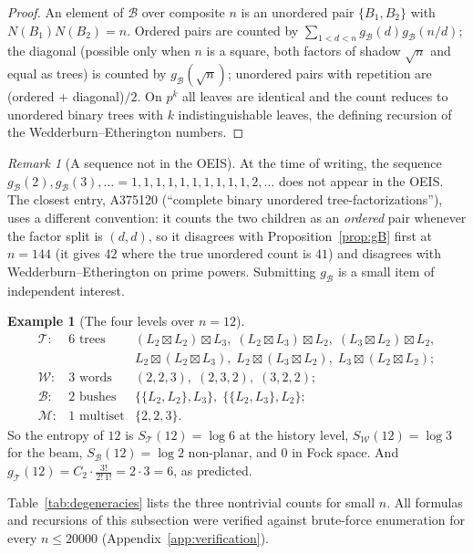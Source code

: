 \documentclass[11pt]{article}
\newcommand{\cT}{\mathcal{T}}   %
\newcommand{\cW}{\mathcal{W}}   %
\newcommand{\cB}{\mathcal{B}}   %
\newcommand{\cM}{\mathcal{M}}   %
\numberwithin{equation}{section}
\theoremstyle{plain}
\theoremstyle{definition}
\newtheorem{example}[theorem]{Example}
\theoremstyle{remark}
\newtheorem{remark}[theorem]{Remark}
\begin{document}
\begin{proof}
An element of $\cB$ over composite $n$ is an unordered pair $\{B_1,B_2\}$ with
$N(B_1)N(B_2) = n$. Ordered pairs are counted by $\sum_{1<d<n} g_\cB(d)g_\cB(n/d)$;
the diagonal (possible only when $n$ is a square, both factors of shadow $\sqrt n$ and
equal as trees) is counted by $g_\cB(\sqrt n)$; unordered pairs with repetition are
(ordered $+$ diagonal)$/2$. On $p^k$ all leaves are identical and the count reduces to
unordered binary trees with $k$ indistinguishable leaves, the defining recursion of
the Wedderburn--Etherington numbers.
\end{proof}

\begin{remark}[A sequence not in the OEIS]\label{rem:newseq}
At the time of writing, the sequence $g_\cB(2), g_\cB(3), \dots =
1,1,1,1,1,1,1,1,1,1,2,\dots$ does not appear in the OEIS. The closest entry, A375120
(``complete binary unordered tree-factorizations''), uses a different convention: it
counts the two children as an \emph{ordered} pair whenever the factor split is
$(d,d)$, so it disagrees with Proposition~\ref{prop:gB} first at $n=144$ (it gives
$42$ where the true unordered count is $41$) and disagrees with
Wedderburn--Etherington on prime powers. Submitting $g_\cB$ is a small item of
independent interest.
\end{remark}

\begin{example}[The four levels over $n = 12$]\label{ex:twelve}
\[
\begin{array}{lll}
\cT: & 6 \text{ trees} &
(L_2\boxtimes L_2)\boxtimes L_3,\;
(L_2\boxtimes L_3)\boxtimes L_2,\;
(L_3\boxtimes L_2)\boxtimes L_2, \\
& & L_2\boxtimes(L_2\boxtimes L_3),\;
L_2\boxtimes(L_3\boxtimes L_2),\;
L_3\boxtimes(L_2\boxtimes L_2); \\[1mm]
\cW: & 3 \text{ words} & (2,2,3),\; (2,3,2),\; (3,2,2); \\[1mm]
\cB: & 2 \text{ bushes} & \{\{L_2,L_2\},L_3\},\; \{\{L_2,L_3\},L_2\}; \\[1mm]
\cM: & 1 \text{ multiset} & \{2,2,3\}.
\end{array}
\]
So the entropy of $12$ is $S_\cT(12) = \log 6$ at the history level,
$S_\cW(12) = \log 3$ for the beam, $S_\cB(12) = \log 2$ non-planar, and $0$ in Fock
space. And $g_\cT(12) = C_2 \cdot \tfrac{3!}{2!\,1!} = 2\cdot 3 = 6$, as predicted.
\end{example}

Table~\ref{tab:degeneracies} lists the three nontrivial counts for small $n$. All
formulas and recursions of this subsection were verified against brute-force
enumeration for every $n \le 20000$ (Appendix~\ref{app:verification}).
\end{document}
